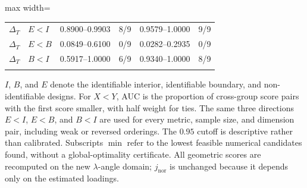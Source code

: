 \documentclass[12pt,letterpaper]{article}
\theoremstyle{plain}
\theoremstyle{definition}
\begin{document}
\begin{table}[p]
\begin{adjustbox}{max width=\linewidth}
\begin{tabular}{llcccc}
\addlinespace
$\Delta_T$ & $E<I$ & 0.8900--0.9903 & 8/9 & 0.9579--1.0000 & 9/9\\
$\Delta_T$ & $E<B$ & 0.0849--0.6100 & 0/9 & 0.0282--0.2935 & 0/9\\
$\Delta_T$ & $B<I$ & 0.5917--1.0000 & 6/9 & 0.9340--1.0000 & 8/9\\
\addlinespace
\bottomrule
\end{tabular}
\end{adjustbox}
\par\smallskip
\begin{minipage}{0.98\linewidth}\footnotesize
$I$, $B$, and $E$ denote the identifiable interior, identifiable boundary, and non-identifiable designs. For $X<Y$, AUC is the proportion of cross-group score pairs with the first score smaller, with half weight for ties. The same three directions $E<I$, $E<B$, and $B<I$ are used for every metric, sample size, and dimension pair, including weak or reversed orderings. The $0.95$ cutoff is descriptive rather than calibrated. Subscripts $\min$ refer to the lowest feasible numerical candidates found, without a global-optimality certificate. All geometric scores are recomputed on the new $\lambda$-angle domain; $j_{\mathrm{nor}}$ is unchanged because it depends only on the estimated loadings.
\end{minipage}
\endgroup
\end{table}
\FloatBarrier
\end{document}
